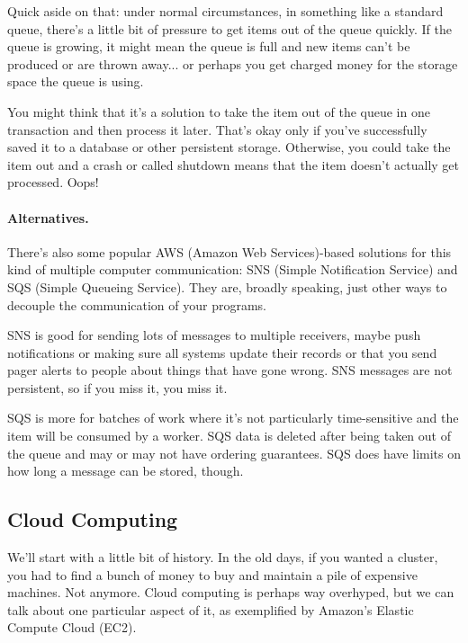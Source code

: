 Quick aside on that: under normal circumstances, in something like a standard queue, there's a little bit of pressure to get items out of the queue quickly. If the queue is growing, it might mean the queue is full and new items can't be produced or are thrown away... or perhaps you get charged money for the storage space the queue is using. 

You might think that it's a solution to take the item out of the queue in one transaction and then process it later. That's okay only if you've successfully saved it to a database or other persistent storage. Otherwise, you could take the item out and a crash or called shutdown means that the item doesn't actually get processed. Oops!

\paragraph{Alternatives.} There's also some popular AWS (Amazon Web Services)-based solutions for this kind of multiple computer communication: SNS (Simple Notification Service) and SQS (Simple Queueing Service). They are, broadly speaking, just other ways to decouple the communication of your programs.

SNS is good for sending lots of messages to multiple receivers, maybe push notifications or making sure all systems update their records or that you send pager alerts to people about things that have gone wrong. SNS messages are not persistent, so if you miss it, you miss it. 

SQS is more for batches of work where it's not particularly time-sensitive and the item will be consumed by a worker. SQS data is deleted after being taken out of the queue and may or may not have ordering guarantees. SQS does have limits on how long a message can be stored, though. 

\subsection*{Cloud Computing}
We'll start with a little bit of history.
In the old days, if you wanted a cluster, you had to find a bunch of
money to buy and maintain a pile of expensive machines. Not anymore.
Cloud computing is perhaps way overhyped, but we can talk about 
one particular aspect of it, as exemplified by Amazon's Elastic
Compute Cloud (EC2).

